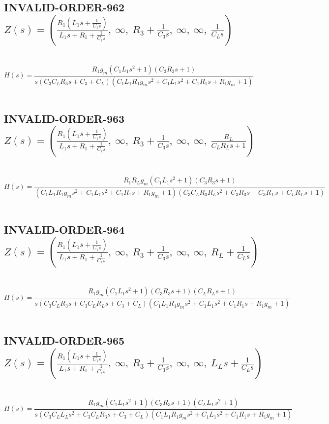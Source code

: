 \documentclass{article}
\begin{document}
\subsection{INVALID-ORDER-962 $Z(s) = \left( \frac{R_{1} \left(L_{1} s + \frac{1}{C_{1} s}\right)}{L_{1} s + R_{1} + \frac{1}{C_{1} s}}, \  \infty, \  R_{3} + \frac{1}{C_{3} s}, \  \infty, \  \infty, \  \frac{1}{C_{L} s}\right)$ } \ 
\textbf{\[H(s) = \frac{R_{1} g_{m} \left(C_{1} L_{1} s^{2} + 1\right) \left(C_{3} R_{3} s + 1\right)}{s \left(C_{3} C_{L} R_{3} s + C_{3} + C_{L}\right) \left(C_{1} L_{1} R_{1} g_{m} s^{2} + C_{1} L_{1} s^{2} + C_{1} R_{1} s + R_{1} g_{m} + 1\right)}\] } \ 
\subsection{INVALID-ORDER-963 $Z(s) = \left( \frac{R_{1} \left(L_{1} s + \frac{1}{C_{1} s}\right)}{L_{1} s + R_{1} + \frac{1}{C_{1} s}}, \  \infty, \  R_{3} + \frac{1}{C_{3} s}, \  \infty, \  \infty, \  \frac{R_{L}}{C_{L} R_{L} s + 1}\right)$ } \ 
\textbf{\[H(s) = \frac{R_{1} R_{L} g_{m} \left(C_{1} L_{1} s^{2} + 1\right) \left(C_{3} R_{3} s + 1\right)}{\left(C_{1} L_{1} R_{1} g_{m} s^{2} + C_{1} L_{1} s^{2} + C_{1} R_{1} s + R_{1} g_{m} + 1\right) \left(C_{3} C_{L} R_{3} R_{L} s^{2} + C_{3} R_{3} s + C_{3} R_{L} s + C_{L} R_{L} s + 1\right)}\] } \ 
\subsection{INVALID-ORDER-964 $Z(s) = \left( \frac{R_{1} \left(L_{1} s + \frac{1}{C_{1} s}\right)}{L_{1} s + R_{1} + \frac{1}{C_{1} s}}, \  \infty, \  R_{3} + \frac{1}{C_{3} s}, \  \infty, \  \infty, \  R_{L} + \frac{1}{C_{L} s}\right)$ } \ 
\textbf{\[H(s) = \frac{R_{1} g_{m} \left(C_{1} L_{1} s^{2} + 1\right) \left(C_{3} R_{3} s + 1\right) \left(C_{L} R_{L} s + 1\right)}{s \left(C_{3} C_{L} R_{3} s + C_{3} C_{L} R_{L} s + C_{3} + C_{L}\right) \left(C_{1} L_{1} R_{1} g_{m} s^{2} + C_{1} L_{1} s^{2} + C_{1} R_{1} s + R_{1} g_{m} + 1\right)}\] } \ 
\subsection{INVALID-ORDER-965 $Z(s) = \left( \frac{R_{1} \left(L_{1} s + \frac{1}{C_{1} s}\right)}{L_{1} s + R_{1} + \frac{1}{C_{1} s}}, \  \infty, \  R_{3} + \frac{1}{C_{3} s}, \  \infty, \  \infty, \  L_{L} s + \frac{1}{C_{L} s}\right)$ } \ 
\textbf{\[H(s) = \frac{R_{1} g_{m} \left(C_{1} L_{1} s^{2} + 1\right) \left(C_{3} R_{3} s + 1\right) \left(C_{L} L_{L} s^{2} + 1\right)}{s \left(C_{3} C_{L} L_{L} s^{2} + C_{3} C_{L} R_{3} s + C_{3} + C_{L}\right) \left(C_{1} L_{1} R_{1} g_{m} s^{2} + C_{1} L_{1} s^{2} + C_{1} R_{1} s + R_{1} g_{m} + 1\right)}\] } \ 
\end{document}
